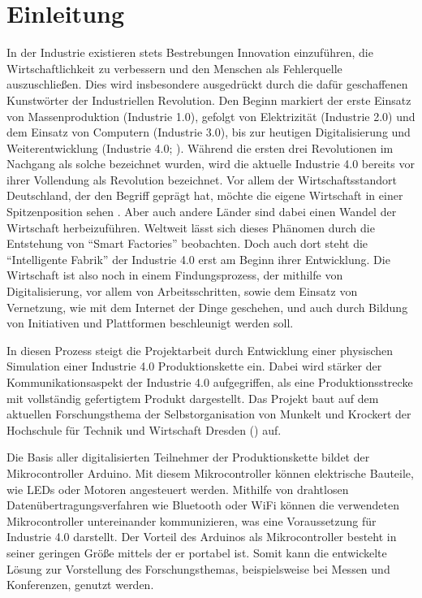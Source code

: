 \chapter{Einleitung}



In der Industrie existieren stets Bestrebungen Innovation einzuführen, die Wirtschaftlichkeit zu verbessern und den Menschen als Fehlerquelle auszuschließen. Dies wird insbesondere ausgedrückt durch die dafür geschaffenen Kunstwörter der Industriellen Revolution. Den Beginn markiert der erste Einsatz von Massenproduktion (Industrie 1.0), gefolgt von Elektrizität (Industrie 2.0) und dem Einsatz von Computern (Industrie 3.0), bis zur heutigen Digitalisierung und Weiterentwicklung (Industrie 4.0; ). Während die ersten drei Revolutionen im Nachgang als solche bezeichnet wurden, wird die aktuelle Industrie 4.0 bereits vor ihrer Vollendung als Revolution bezeichnet. Vor allem der Wirtschaftsstandort Deutschland, der den Begriff geprägt hat, möchte die eigene Wirtschaft in einer Spitzenposition sehen \autocite{arbeitsbericht}. Aber auch andere Länder sind dabei einen Wandel der Wirtschaft herbeizuführen. Weltweit lässt sich dieses Phänomen durch die Entstehung von \enquote{Smart Factories} beobachten. Doch auch dort steht die \enquote{Intelligente Fabrik} der Industrie 4.0 erst am Beginn ihrer Entwicklung. Die Wirtschaft ist also noch in einem Findungsprozess, der mithilfe von Digitalisierung, vor allem von Arbeitsschritten, sowie dem Einsatz von Vernetzung, wie mit dem Internet der Dinge geschehen, und auch durch Bildung von Initiativen und Plattformen beschleunigt werden soll.

In diesen Prozess steigt die Projektarbeit durch Entwicklung einer physischen Simulation einer Industrie 4.0 Produktionskette ein. Dabei wird stärker der Kommunikationsaspekt der Industrie 4.0 aufgegriffen, als eine Produktionsstrecke mit vollständig gefertigtem Produkt dargestellt. Das Projekt baut auf dem aktuellen Forschungsthema der Selbstorganisation von Munkelt und Krockert der Hochschule für Technik und Wirtschaft Dresden (\citeyear{agents}) auf.

Die Basis aller digitalisierten Teilnehmer der Produktionskette bildet der Mikrocontroller Arduino. Mit diesem Mikrocontroller können elektrische Bauteile, wie LEDs oder Motoren angesteuert werden. Mithilfe von drahtlosen Datenübertragungsverfahren wie Bluetooth oder WiFi können die verwendeten Mikrocontroller untereinander kommunizieren, was eine Voraussetzung für Industrie 4.0 darstellt. Der Vorteil des Arduinos als Mikrocontroller besteht in seiner geringen Größe mittels der er portabel ist. Somit kann die entwickelte Lösung zur Vorstellung des Forschungsthemas, beispielsweise bei Messen und Konferenzen, genutzt werden. 